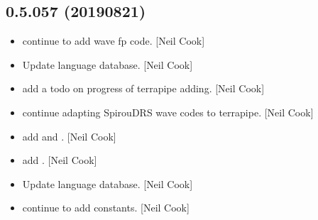 \documentclass[a4paper,10pt,english]{report}
\begin{document}
\subsection{0.5.057 (2019\sphinxhyphen{}08\sphinxhyphen{}21)}
\label{\detokenize{misc/changelog:id105}}\begin{itemize}
\item {} 
 \sphinxhyphen{} continue to add wave fp code. {[}Neil Cook{]}

\item {} 
Update language database. {[}Neil Cook{]}

\item {} 
 \sphinxhyphen{} add a todo on progress of terrapipe adding. {[}Neil
Cook{]}

\item {} 
 \sphinxhyphen{} continue adapting SpirouDRS wave codes to
terrapipe. {[}Neil Cook{]}

\item {} 
 \sphinxhyphen{} add   and
. {[}Neil Cook{]}

\item {} 
 \sphinxhyphen{} add . {[}Neil Cook{]}

\item {} 
Update language database. {[}Neil Cook{]}

\item {} 
 \sphinxhyphen{} continue to add  constants. {[}Neil Cook{]}

\end{itemize}
\end{document}
